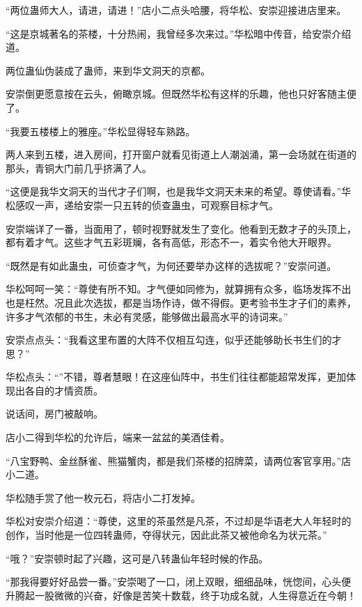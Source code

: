 
\begin{this_body}

“两位蛊师大人，请进，请进！”店小二点头哈腰，将华松、安崇迎接进店里来。

“这是京城著名的茶楼，十分热闹，我曾经多次来过。”华松暗中传音，给安崇介绍道。

两位蛊仙伪装成了蛊师，来到华文洞天的京都。

安崇倒更愿意按在云头，俯瞰京城。但既然华松有这样的乐趣，他也只好客随主便了。

“我要五楼楼上的雅座。”华松显得轻车熟路。

两人来到五楼，进入房间，打开窗户就看见街道上人潮汹涌，第一会场就在街道的那头，青铜大门前几乎挤满了人。

“这便是我华文洞天的当代才子们啊，也是我华文洞天未来的希望。尊使请看。”华松感叹一声，递给安崇一只五转的侦查蛊虫，可观察目标才气。

安崇端详了一番，当面用了，顿时视野就发生了变化。他看到无数才子的头顶上，都有着才气。这些才气五彩斑斓，各有高低，形态不一，着实令他大开眼界。

“既然是有如此蛊虫，可侦查才气，为何还要举办这样的选拔呢？”安崇问道。

华松呵呵一笑：“尊使有所不知。才气便如同修为，就算拥有众多，临场发挥不出也是枉然。况且此次选拔，都是当场作诗，做不得假。更考验书生才子们的素养，许多才气浓郁的书生，未必有灵感，能够做出最高水平的诗词来。”

安崇点点头：“我看这里布置的大阵不仅相互勾连，似乎还能够助长书生们的才思？”

华松点头：“”不错，尊者慧眼！在这座仙阵中，书生们往往都能超常发挥，更加体现出各自的才情资质。

说话间，房门被敲响。

店小二得到华松的允许后，端来一盆盆的美酒佳肴。

“八宝野鸭、金丝酥雀、熊猫蟹肉，都是我们茶楼的招牌菜，请两位客官享用。”店小二道。

华松随手赏了他一枚元石，将店小二打发掉。

华松对安崇介绍道：“尊使，这里的茶虽然是凡茶，不过却是华语老大人年轻时的创作，当时他是一位四转蛊师，夺得状元，因此此茶又被他命名为状元茶。”

“哦？”安崇顿时起了兴趣，这可是八转蛊仙年轻时候的作品。

“那我得要好好品尝一番。”安崇喝了一口，闭上双眼，细细品味，恍惚间，心头便升腾起一股微微的兴奋，好像是苦笑十数载，终于功成名就，人生得意近在今朝！


\end{this_body}
